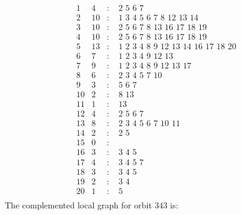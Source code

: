 \documentclass[12pt]{article}
\begin{document}
\begin{equation*}
\begin{array}{rrcl}
1&4&:&\,\,2\,\,5\,\,6\,\,7\\
2&10&:&\,\,1\,\,3\,\,4\,\,5\,\,6\,\,7\,\,8\,\,12\,\,13\,\,14\\
3&10&:&\,\,2\,\,5\,\,6\,\,7\,\,8\,\,13\,\,16\,\,17\,\,18\,\,19\\
4&10&:&\,\,2\,\,5\,\,6\,\,7\,\,8\,\,13\,\,16\,\,17\,\,18\,\,19\\
5&13&:&\,\,1\,\,2\,\,3\,\,4\,\,8\,\,9\,\,12\,\,13\,\,14\,\,16\,\,17\,\,18\,\,20\\
6&7&:&\,\,1\,\,2\,\,3\,\,4\,\,9\,\,12\,\,13\\
7&9&:&\,\,1\,\,2\,\,3\,\,4\,\,8\,\,9\,\,12\,\,13\,\,17\\
8&6&:&\,\,2\,\,3\,\,4\,\,5\,\,7\,\,10\\
9&3&:&\,\,5\,\,6\,\,7\\
10&2&:&\,\,8\,\,13\\
11&1&:&\,\,13\\
12&4&:&\,\,2\,\,5\,\,6\,\,7\\
13&8&:&\,\,2\,\,3\,\,4\,\,5\,\,6\,\,7\,\,10\,\,11\\
14&2&:&\,\,2\,\,5\\
15&0&:&\\
16&3&:&\,\,3\,\,4\,\,5\\
17&4&:&\,\,3\,\,4\,\,5\,\,7\\
18&3&:&\,\,3\,\,4\,\,5\\
19&2&:&\,\,3\,\,4\\
20&1&:&\,\,5\\
\end{array}
\end{equation*}
The complemented local graph for orbit $343$ is:
\end{document}

